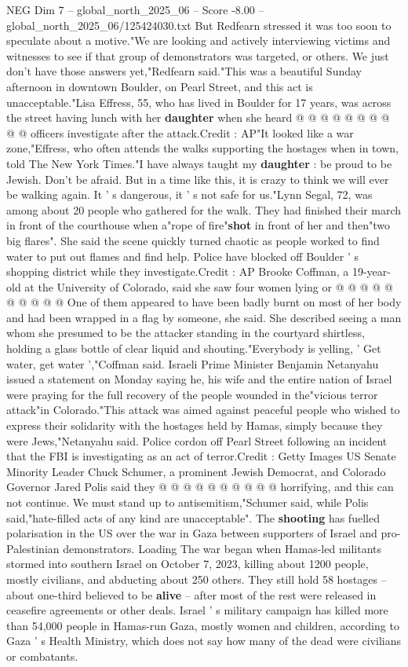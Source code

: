 \begin{textsample}{NEG Dim 7 – global\_north\_2025\_06 – Score -8.00 – global\_north\_2025\_06/125424030.txt}
But Redfearn stressed it was too soon to speculate about a motive."We are looking and actively interviewing victims and witnesses to see if that group of demonstrators was targeted, or others.
We just don't have those answers yet,"Redfearn said."This was a beautiful Sunday afternoon in downtown Boulder, on Pearl Street, and this act is unacceptable."Lisa Effress, 55, who has lived in Boulder for 17 years, was across the street having lunch with her \textbf{daughter} when she heard @ @ @ @ @ @ @ @ @ @ officers investigate after the attack.Credit : AP"It looked like a war zone,"Effress, who often attends the walks supporting the hostages when in town, told The New York Times."I have always taught my \textbf{daughter} : be proud to be Jewish.
Don't be afraid.
But in a time like this, it is crazy to think we will ever be walking again.
It ' s dangerous, it ' s not safe for us."Lynn Segal, 72, was among about 20 people who gathered for the walk.
They had finished their march in front of the courthouse when a"rope of fire"\textbf{shot} in front of her and then"two big flares".
She said the scene quickly turned chaotic as people worked to find water to put out flames and find help.
Police have blocked off Boulder ' s shopping district while they investigate.Credit : AP Brooke Coffman, a 19-year-old at the University of Colorado, said she saw four women lying or @ @ @ @ @ @ @ @ @ @ One of them appeared to have been badly burnt on most of her body and had been wrapped in a flag by someone, she said.
She described seeing a man whom she presumed to be the attacker standing in the courtyard shirtless, holding a glass bottle of clear liquid and shouting."Everybody is yelling, ' Get water, get water ',"Coffman said.
Israeli Prime Minister Benjamin Netanyahu issued a statement on Monday saying he, his wife and the entire nation of Israel were praying for the full recovery of the people wounded in the"vicious terror attack"in Colorado."This attack was aimed against peaceful people who wished to express their solidarity with the hostages held by Hamas, simply because they were Jews,"Netanyahu said.
Police cordon off Pearl Street following an incident that the FBI is investigating as an act of terror.Credit : Getty Images US Senate Minority Leader Chuck Schumer, a prominent Jewish Democrat, and Colorado Governor Jared Polis said they @ @ @ @ @ @ @ @ @ @ horrifying, and this can not continue.
We must stand up to antisemitism,"Schumer said, while Polis said,"hate-filled acts of any kind are unacceptable".
The \textbf{shooting} has fuelled polarisation in the US over the war in Gaza between supporters of Israel and pro-Palestinian demonstrators.
Loading The war began when Hamas-led militants stormed into southern Israel on October 7, 2023, killing about 1200 people, mostly civilians, and abducting about 250 others.
They still hold 58 hostages -- about one-third believed to be \textbf{alive} -- after most of the rest were released in ceasefire agreements or other deals.
Israel ' s military campaign has killed more than 54,000 people in Hamas-run Gaza, mostly women and children, according to Gaza ' s Health Ministry, which does not say how many of the dead were civilians or combatants.


\end{textsample}
